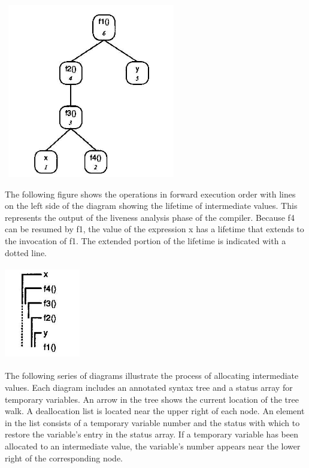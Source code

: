 {\centering{}
\includegraphics[width=3.0in,height=3.0in]{kw/figure8-1.png}
\par}

The following figure shows the operations in forward execution order
with lines on the left side of the diagram showing the lifetime of
intermediate values. This represents the output of the liveness
analysis phase of the compiler. Because f4 can be resumed by f1, the
value of the expression x has a lifetime that extends to the
invocation of f1. The extended portion of the lifetime is indicated
with a dotted line.

{\centering{}
\includegraphics[width=1.3in,height=1.6in]{kw/figure8-2.png}
\par}


The following series of diagrams illustrate the process of allocating
intermediate values. Each diagram includes an annotated syntax tree
and a status array for temporary variables. An arrow in the tree shows
the current location of the tree walk. A deallocation list is located
near the upper right of each node. An element in the list consists of
a temporary variable number and the status with which to restore the
variable's entry in the status array. If a temporary variable has been
allocated to an intermediate value, the variable's number appears near
the lower right of the corresponding node.

